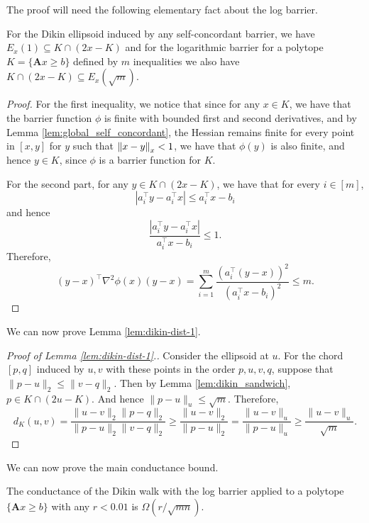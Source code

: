The proof will need the following elementary fact about the log barrier.
\begin{lem}
\label{lem:dikin_sandwich}For the Dikin ellipsoid induced by any
self-concordant barrier, we have $E_{x}(1)\subseteq K\cap(2x-K)$
and for the logarithmic barrier for a polytope $K=\{\mathbf{A}x\ge b\}$
defined by $m$ inequalities we also have $K\cap(2x-K)\subseteq E_{x}(\sqrt{m})$.
\end{lem}

\begin{proof}
For the first inequality, we notice that since for any $x\in K$,
we have that the barrier function $\phi$ is finite with bounded first
and second derivatives, and by Lemma \ref{lem:global_self_concordant},
the Hessian remains finite for every point in $[x,y]$ for $y$ such
that $\left\Vert x-y\right\Vert_{x}<1$, we have that $\phi(y)$ is also finite,
and hence $y\in K$, since $\phi$ is a barrier function for $K$. 

For the second part, for any $y\in K\cap(2x-K)$, we have that for
every $i\in[m]$, 
\[
\left|a^{\top}_{i}y-a^{\top}_{i}x\right|\le a^{\top}_{i}x-b_{i}
\]
and hence 
\[
\frac{\left|a^{\top}_{i}y-a^{\top}_{i}x\right|}{a^{\top}_{i}x-b_{i}}\le1.
\]
Therefore, 
\[
(y-x)^{\top}\nabla^{2}\phi(x)(y-x)=\sum^{m}_{i=1}\frac{\left(a^{\top}_{i}(y-x)\right)^{2}}{\left(a^{\top}_{i}x-b_{i}\right)^{2}}\le m.
\]
\end{proof}
We can now prove Lemma \ref{lem:dikin-dist-1}.
\begin{proof}[Proof of Lemma \ref{lem:dikin-dist-1}.]
 Consider the ellipsoid at $u$. For the chord $[p,q]$ induced by
$u,v$ with these points in the order $p,u,v,q$, suppose that $\|p-u\|_{2}\le\|v-q\|_{2}$.
Then by Lemma \ref{lem:dikin_sandwich}, $p\in K\cap(2u-K)$. And
hence $\|p-u\|_{u}\le\sqrt{m}.$ Therefore, 
\[
d_{K}(u,v)=\frac{\|u-v\|_{2}\|p-q\|_{2}}{\|p-u\|_{2}\|v-q\|_{2}}\geq\frac{\|u-v\|_{2}}{\|p-u\|_{2}}=\frac{\|u-v\|_{u}}{\|p-u\|_{u}}\ge\frac{\|u-v\|_{u}}{\sqrt{m}}.
\]
\end{proof}
We can now prove the main conductance bound.
\begin{thm}
The conductance of the Dikin walk with the log barrier applied to
a polytope $\{\mathbf{A}x\ge b\}$ with any $r<0.01$ is $\Omega(r/\sqrt{mn})$.
\end{thm}


